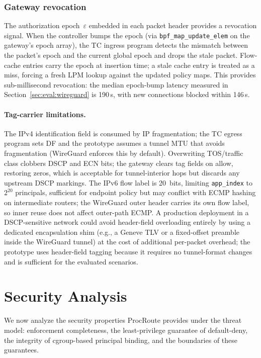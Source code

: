 \documentclass[sigconf]{acmart}
\begin{document}
\subsubsection{Gateway revocation}

The authorization epoch~$\varepsilon$ embedded in each packet
header provides a revocation signal.  When the controller bumps
the epoch (via \texttt{bpf\_map\_update\_elem} on the gateway's
epoch array), the TC ingress program detects the mismatch between
the packet's epoch and the current global epoch and drops the
stale packet.
Flow-cache entries carry the epoch at insertion time; a stale cache
entry is treated as a miss, forcing a fresh LPM lookup against the
updated policy maps.
This provides sub-millisecond revocation: the median epoch-bump
latency measured in Section~\ref{sec:eval:wireguard} is
190\,\textmu{}s, with new connections blocked within
146\,\textmu{}s.

\paragraph{Tag-carrier limitations.}
The IPv4 identification field is consumed by IP fragmentation;
the TC egress program sets DF and the prototype assumes a
tunnel MTU that avoids fragmentation (WireGuard enforces this
by default).
Overwriting TOS/traffic class clobbers DSCP and ECN bits;
the gateway clears tag fields on allow, restoring zeros, which
is acceptable for tunnel-interior hops but discards any
upstream DSCP markings.
The IPv6 flow label is 20~bits, limiting \texttt{app\_index}
to $2^{20}$ principals, sufficient for endpoint policy but
may conflict with ECMP hashing on intermediate routers; the
WireGuard outer header carries its own flow label, so inner
reuse does not affect outer-path ECMP.
A production deployment in a DSCP-sensitive network could avoid
header-field overloading entirely by using a dedicated
encapsulation shim (e.g., a Geneve TLV or a fixed-offset
preamble inside the WireGuard tunnel) at the cost of additional
per-packet overhead; the prototype uses header-field tagging
because it requires no tunnel-format changes and is sufficient
for the evaluated scenarios.

\section{Security Analysis}
\label{sec:security}

We now analyze the security properties ProcRoute provides under
the threat model: enforcement
completeness, the least-privilege guarantee of default-deny,
the integrity of cgroup-based principal binding, and the
boundaries of these guarantees.
\end{document}
